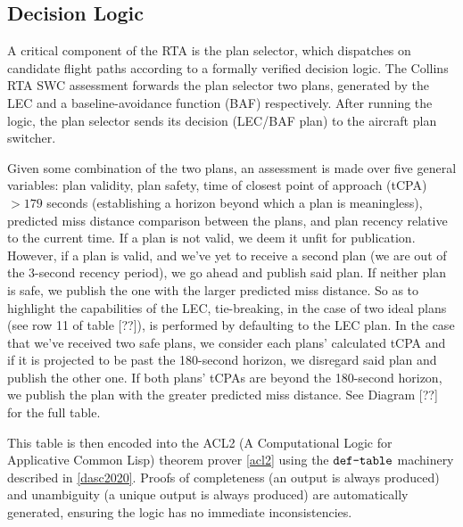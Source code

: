 \subsection{Decision Logic}




A critical component of the RTA is the plan selector, which dispatches on candidate flight paths according to a formally verified decision logic. The Collins RTA SWC assessment forwards the plan selector two plans, generated by the LEC and a baseline-avoidance function (BAF) respectively. After running the logic, the plan selector sends its decision (LEC/BAF plan) to the aircraft plan switcher.


Given some combination of the two plans, an assessment is made over five general variables: plan validity, plan safety, time of closest point of approach (tCPA) $> 179$ seconds (establishing a horizon beyond which a plan is meaningless), predicted miss distance comparison between the plans, and plan recency relative to the current time. If a plan is not valid, we deem it unfit for publication. However, if a plan is valid, and we've yet to receive a second plan (we are out of the 3-second recency period), we go ahead and publish said plan. If neither plan is safe, we publish the one with the larger predicted miss distance. So as to highlight the capabilities of the LEC, tie-breaking, in the case of two ideal plans (see row 11 of table [??]), is performed by defaulting to the LEC plan. In the case that we've received two safe plans, we consider each plans' calculated tCPA and if it is projected to be past the 180-second horizon, we disregard said plan and publish the other one. If both plans' tCPAs are beyond the 180-second horizon, we publish the plan with the greater predicted miss distance. See Diagram [??] for the full table.

This table is then encoded into the ACL2 (A Computational Logic for Applicative Common Lisp) theorem prover \ref{acl2} using the $\verb+def-table+$ machinery described in \ref{dasc2020}. Proofs of completeness (an output is always produced) and unambiguity (a unique output is always produced) are automatically generated, ensuring the logic has no immediate inconsistencies.


